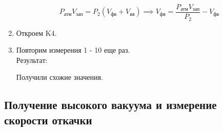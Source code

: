 \documentclass[a4paper,12pt]{article}
\begin{document}
\begin{enumerate}
  \begin{equation}
    P_\text{атм} V_\text{зап} = P_2 (V_\text{фв} + V_\text{вв})
    \implies
    V_\text{фв} = \frac{P_\text{атм} V_\text{зап}}{P_2} - V_\text{фв}
  \end{equation}

  \begin{center}
  \end{center}

  \item Откроем K4.

  \item Повторим измерения 1 - 10 еще раз. \\
  Результат:
  \begin{center}
  \end{center}

  \begin{center}
  \end{center}

  Получили схожие значения.

\end{enumerate}

\subsection{Получение высокого вакуума и измерение скорости откачки}
\end{document}
